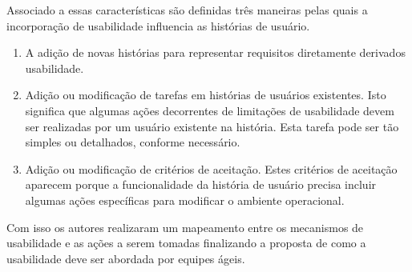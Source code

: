 \begin{enumerate}
Associado a essas características são definidas três maneiras pelas quais a incorporação de usabilidade influencia as histórias de usuário.
\begin{enumerate}
\item A adição de novas histórias para representar requisitos diretamente derivados usabilidade.
\item Adição ou modificação de tarefas em histórias de usuários existentes. Isto significa que algumas ações decorrentes de limitações de usabilidade devem ser realizadas por um usuário existente na história. Esta tarefa pode ser tão simples ou detalhados, conforme necessário.
\item Adição ou modificação de critérios de aceitação. Estes critérios de aceitação aparecem porque a funcionalidade da história de usuário precisa incluir algumas ações específicas para modificar o ambiente operacional.
\end{enumerate}

Com isso os autores realizaram um mapeamento entre os mecanismos de usabilidade e as ações a serem tomadas finalizando a proposta de como a usabilidade deve ser abordada por equipes ágeis.


\end{enumerate}
